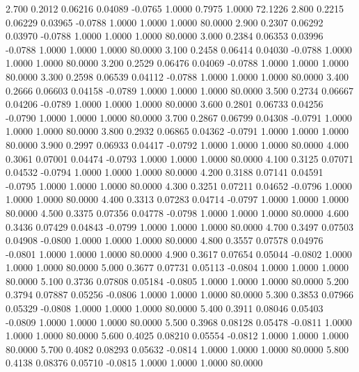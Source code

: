    2.700   0.2012   0.06216   0.04089  -0.0765   1.0000   0.7975   1.0000  72.1226
   2.800   0.2215   0.06229   0.03965  -0.0788   1.0000   1.0000   1.0000  80.0000
   2.900   0.2307   0.06292   0.03970  -0.0788   1.0000   1.0000   1.0000  80.0000
   3.000   0.2384   0.06353   0.03996  -0.0788   1.0000   1.0000   1.0000  80.0000
   3.100   0.2458   0.06414   0.04030  -0.0788   1.0000   1.0000   1.0000  80.0000
   3.200   0.2529   0.06476   0.04069  -0.0788   1.0000   1.0000   1.0000  80.0000
   3.300   0.2598   0.06539   0.04112  -0.0788   1.0000   1.0000   1.0000  80.0000
   3.400   0.2666   0.06603   0.04158  -0.0789   1.0000   1.0000   1.0000  80.0000
   3.500   0.2734   0.06667   0.04206  -0.0789   1.0000   1.0000   1.0000  80.0000
   3.600   0.2801   0.06733   0.04256  -0.0790   1.0000   1.0000   1.0000  80.0000
   3.700   0.2867   0.06799   0.04308  -0.0791   1.0000   1.0000   1.0000  80.0000
   3.800   0.2932   0.06865   0.04362  -0.0791   1.0000   1.0000   1.0000  80.0000
   3.900   0.2997   0.06933   0.04417  -0.0792   1.0000   1.0000   1.0000  80.0000
   4.000   0.3061   0.07001   0.04474  -0.0793   1.0000   1.0000   1.0000  80.0000
   4.100   0.3125   0.07071   0.04532  -0.0794   1.0000   1.0000   1.0000  80.0000
   4.200   0.3188   0.07141   0.04591  -0.0795   1.0000   1.0000   1.0000  80.0000
   4.300   0.3251   0.07211   0.04652  -0.0796   1.0000   1.0000   1.0000  80.0000
   4.400   0.3313   0.07283   0.04714  -0.0797   1.0000   1.0000   1.0000  80.0000
   4.500   0.3375   0.07356   0.04778  -0.0798   1.0000   1.0000   1.0000  80.0000
   4.600   0.3436   0.07429   0.04843  -0.0799   1.0000   1.0000   1.0000  80.0000
   4.700   0.3497   0.07503   0.04908  -0.0800   1.0000   1.0000   1.0000  80.0000
   4.800   0.3557   0.07578   0.04976  -0.0801   1.0000   1.0000   1.0000  80.0000
   4.900   0.3617   0.07654   0.05044  -0.0802   1.0000   1.0000   1.0000  80.0000
   5.000   0.3677   0.07731   0.05113  -0.0804   1.0000   1.0000   1.0000  80.0000
   5.100   0.3736   0.07808   0.05184  -0.0805   1.0000   1.0000   1.0000  80.0000
   5.200   0.3794   0.07887   0.05256  -0.0806   1.0000   1.0000   1.0000  80.0000
   5.300   0.3853   0.07966   0.05329  -0.0808   1.0000   1.0000   1.0000  80.0000
   5.400   0.3911   0.08046   0.05403  -0.0809   1.0000   1.0000   1.0000  80.0000
   5.500   0.3968   0.08128   0.05478  -0.0811   1.0000   1.0000   1.0000  80.0000
   5.600   0.4025   0.08210   0.05554  -0.0812   1.0000   1.0000   1.0000  80.0000
   5.700   0.4082   0.08293   0.05632  -0.0814   1.0000   1.0000   1.0000  80.0000
   5.800   0.4138   0.08376   0.05710  -0.0815   1.0000   1.0000   1.0000  80.0000
